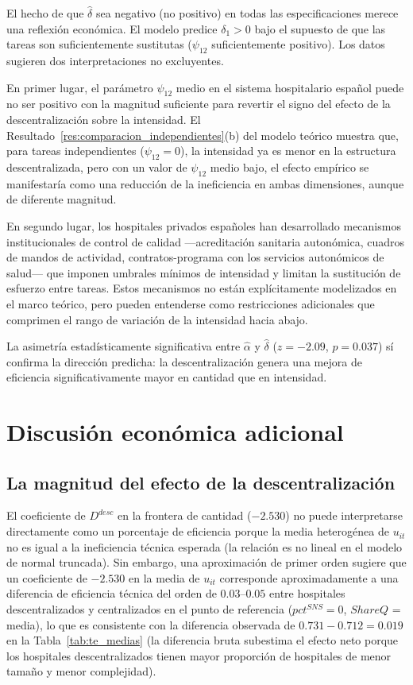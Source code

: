 \documentclass[12pt, a4paper, twoside, openright]{book}
\theoremstyle{plain}
\theoremstyle{definition}
\theoremstyle{remark}
\begin{document}
El hecho de que $\hat{\delta}$ sea negativo (no positivo) en todas las especificaciones merece una reflexión económica. El modelo predice $\delta_1 > 0$ bajo el supuesto de que las tareas son suficientemente sustitutas ($\psi_{12}$ suficientemente positivo). Los datos sugieren dos interpretaciones no excluyentes.

En primer lugar, el parámetro $\psi_{12}$ medio en el sistema hospitalario español puede no ser positivo con la magnitud suficiente para revertir el signo del efecto de la descentralización sobre la intensidad. El Resultado~\ref{res:comparacion_independientes}(b) del modelo teórico muestra que, para tareas independientes ($\psi_{12}=0$), la intensidad ya es menor en la estructura descentralizada, pero con un valor de $\psi_{12}$ medio bajo, el efecto empírico se manifestaría como una reducción de la ineficiencia en ambas dimensiones, aunque de diferente magnitud.

En segundo lugar, los hospitales privados españoles han desarrollado mecanismos institucionales de control de calidad ---acreditación sanitaria autonómica, cuadros de mandos de actividad, contratos-programa con los servicios autonómicos de salud--- que imponen umbrales mínimos de intensidad y limitan la sustitución de esfuerzo entre tareas. Estos mecanismos no están explícitamente modelizados en el marco teórico, pero pueden entenderse como restricciones adicionales que comprimen el rango de variación de la intensidad hacia abajo.

La asimetría estadísticamente significativa entre $\hat{\alpha}$ y $\hat{\delta}$ ($z=-2.09$, $p=0.037$) sí confirma la dirección predicha: la descentralización genera una mejora de eficiencia significativamente mayor en cantidad que en intensidad.

\section{Discusión económica adicional}
\label{sec:discusion_economica}

\subsection{La magnitud del efecto de la descentralización}

El coeficiente de $D^{desc}$ en la frontera de cantidad ($-2.530$) no puede interpretarse directamente como un porcentaje de eficiencia porque la media heterogénea de $u_{it}$ no es igual a la ineficiencia técnica esperada (la relación es no lineal en el modelo de normal truncada). Sin embargo, una aproximación de primer orden sugiere que un coeficiente de $-2.530$ en la media de $u_{it}$ corresponde aproximadamente a una diferencia de eficiencia técnica del orden de $0.03$--$0.05$ entre hospitales descentralizados y centralizados en el punto de referencia ($pct^{SNS} = 0$, $ShareQ$ = media), lo que es consistente con la diferencia observada de $0.731 - 0.712 = 0.019$ en la Tabla~\ref{tab:te_medias} (la diferencia bruta subestima el efecto neto porque los hospitales descentralizados tienen mayor proporción de hospitales de menor tamaño y menor complejidad).
\end{document}
